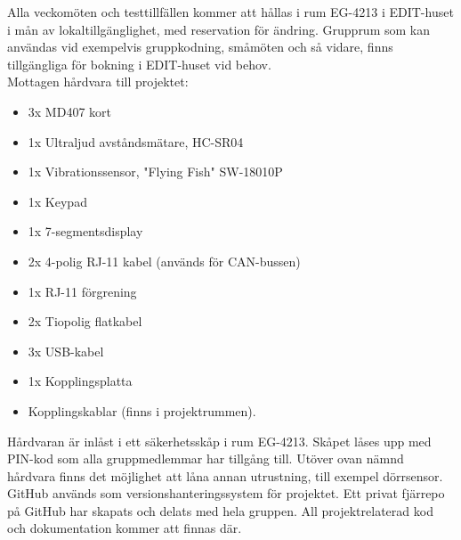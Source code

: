 \documentclass[a4paper]{article}
\begin{document}
Alla veckomöten och testtillfällen kommer att hållas i rum EG-4213 i EDIT-huset i mån av lokaltillgänglighet, med reservation för ändring. Grupprum som kan användas vid exempelvis gruppkodning, småmöten och så vidare, finns tillgängliga för bokning i EDIT-huset vid behov. \\

Mottagen hårdvara till projektet: 
\begin{itemize}
	\item 3x MD407 kort
	\item 1x Ultraljud avståndsmätare, HC-SR04
	\item 1x Vibrationssensor, "Flying Fish" SW-18010P
	\item 1x Keypad
	\item 1x 7-segmentsdisplay
	\item 2x 4-polig RJ-11 kabel (används för CAN-bussen)
	\item 1x RJ-11 förgrening
	\item 2x Tiopolig flatkabel
	\item 3x USB-kabel
	\item 1x Kopplingsplatta
	\item Kopplingskablar (finns i projektrummen).
\end{itemize}

Hårdvaran är inlåst i ett säkerhetsskåp i rum EG-4213. Skåpet låses upp med PIN-kod som alla gruppmedlemmar har tillgång till. Utöver ovan nämnd hårdvara finns det möjlighet att låna annan utrustning, till exempel dörrsensor.
GitHub används som versionshanteringssystem för projektet. Ett privat fjärrepo på GitHub har skapats och delats med hela gruppen. All projektrelaterad kod och dokumentation kommer att finnas där.
\end{document}
